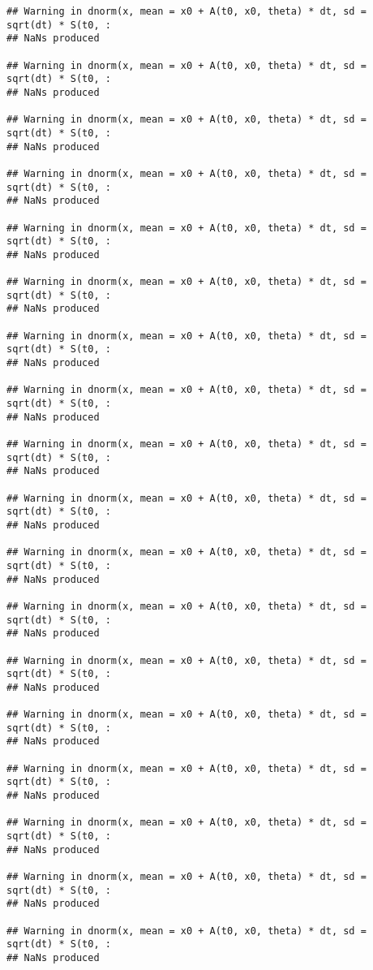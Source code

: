 \documentclass[
]{article}
\begin{document}
\begin{verbatim}
## Warning in dnorm(x, mean = x0 + A(t0, x0, theta) * dt, sd = sqrt(dt) * S(t0, :
## NaNs produced

## Warning in dnorm(x, mean = x0 + A(t0, x0, theta) * dt, sd = sqrt(dt) * S(t0, :
## NaNs produced

## Warning in dnorm(x, mean = x0 + A(t0, x0, theta) * dt, sd = sqrt(dt) * S(t0, :
## NaNs produced

## Warning in dnorm(x, mean = x0 + A(t0, x0, theta) * dt, sd = sqrt(dt) * S(t0, :
## NaNs produced

## Warning in dnorm(x, mean = x0 + A(t0, x0, theta) * dt, sd = sqrt(dt) * S(t0, :
## NaNs produced

## Warning in dnorm(x, mean = x0 + A(t0, x0, theta) * dt, sd = sqrt(dt) * S(t0, :
## NaNs produced

## Warning in dnorm(x, mean = x0 + A(t0, x0, theta) * dt, sd = sqrt(dt) * S(t0, :
## NaNs produced

## Warning in dnorm(x, mean = x0 + A(t0, x0, theta) * dt, sd = sqrt(dt) * S(t0, :
## NaNs produced

## Warning in dnorm(x, mean = x0 + A(t0, x0, theta) * dt, sd = sqrt(dt) * S(t0, :
## NaNs produced

## Warning in dnorm(x, mean = x0 + A(t0, x0, theta) * dt, sd = sqrt(dt) * S(t0, :
## NaNs produced

## Warning in dnorm(x, mean = x0 + A(t0, x0, theta) * dt, sd = sqrt(dt) * S(t0, :
## NaNs produced

## Warning in dnorm(x, mean = x0 + A(t0, x0, theta) * dt, sd = sqrt(dt) * S(t0, :
## NaNs produced

## Warning in dnorm(x, mean = x0 + A(t0, x0, theta) * dt, sd = sqrt(dt) * S(t0, :
## NaNs produced

## Warning in dnorm(x, mean = x0 + A(t0, x0, theta) * dt, sd = sqrt(dt) * S(t0, :
## NaNs produced

## Warning in dnorm(x, mean = x0 + A(t0, x0, theta) * dt, sd = sqrt(dt) * S(t0, :
## NaNs produced

## Warning in dnorm(x, mean = x0 + A(t0, x0, theta) * dt, sd = sqrt(dt) * S(t0, :
## NaNs produced

## Warning in dnorm(x, mean = x0 + A(t0, x0, theta) * dt, sd = sqrt(dt) * S(t0, :
## NaNs produced

## Warning in dnorm(x, mean = x0 + A(t0, x0, theta) * dt, sd = sqrt(dt) * S(t0, :
## NaNs produced
\end{verbatim}
\end{document}
